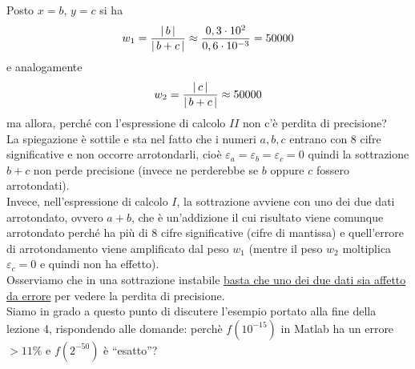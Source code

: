 \documentclass[12pt]{article}
\DeclarePairedDelimiter{\abs}{\lvert}{\rvert}
\begin{document}
Posto $x=b$, $y=c$ si ha \[w_1 = \frac{\abs{\,b\,}}{\abs{\,b+c\,}} \approx \frac{0,3 \cdot 10^2}{0,6 \cdot 10^{-3}} = 50000\] 
e analogamente \[w_2 = \frac{\abs{\,c\,}}{\abs{\,b+c\,}} \approx 50000\]
ma allora, perché con l’espressione di calcolo $II$ non c’è perdita di precisione?\\
La spiegazione è sottile e sta nel fatto che i numeri $a, b, c$ entrano con 8 cifre significative e non occorre arrotondarli, cioè $\varepsilon_a = \varepsilon_b = \varepsilon_c = 0$ quindi la sottrazione $b+c$ non perde precisione (invece ne perderebbe se $b$ oppure $c$ fossero arrotondati).\\
Invece, nell'espressione di calcolo $I$, la sottrazione avviene con uno dei due dati arrotondato, ovvero $a+b$, che è un’addizione il cui risultato viene comunque arrotondato perché ha più di 8 cifre significative (cifre di mantissa) e quell'errore di arrotondamento viene amplificato dal peso $w_1$ (mentre il peso $w_2$ moltiplica $\varepsilon_c = 0$ e quindi non ha effetto).\\
Osserviamo che in una sottrazione instabile \uline{basta che uno dei due dati sia affetto da errore} per vedere la perdita di precisione.\\
Siamo in grado a questo punto di discutere l’esempio portato alla fine della lezione 4, rispondendo alle domande: perchè $f(10^{-15})$ in Matlab ha un errore $>11\%$ e $f(2^{-50})$ è “esatto”?
 
\end{document}
